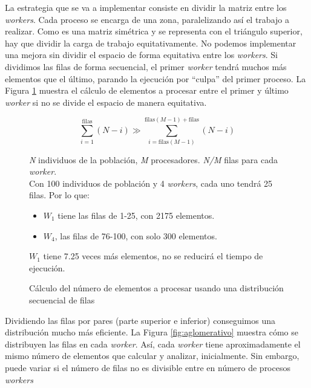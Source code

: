 		La estrategia que se va a implementar consiste en dividir la matriz entre los \textit{workers}. Cada proceso se encarga de una zona, paralelizando así el trabajo a realizar. Como es una matriz simétrica y se representa con el triángulo superior, hay que dividir la carga de trabajo equitativamente. No podemos implementar una mejora sin dividir el espacio de forma equitativa entre los \textit{workers}. Si dividimos las filas de forma secuencial, el primer \textit{worker} tendrá muchos más elementos que el último, parando la ejecución por ``culpa'' del primer proceso. La Figura \ref{fig:prueba} muestra el cálculo de elementos a procesar entre el primer y último \textit{worker} si no se divide el espacio de manera equitativa. 
		
		
		
		\begin{figure}[!h]		
		\begin{mdframed}[roundcorner=5pt]
			\[
			\sum_{i=1}^{\text{filas}} (N - i) \gg \sum_{i=\text{filas}(M-1)}^{\text{filas}(M-1) + \text{filas}} (N - i)
			\]
			\begin{tcolorbox}[boxrule=0.5pt, fontupper=\small]
				
				\textit{N} individuos de la población, \textit{M} procesadores. \textit{N/M} filas para cada \textit{worker}.\\
				
				Con 100 individuos de población y 4 \textit{workers}, cada uno tendrá 25 filas. Por lo que:
				\begin{itemize}
					\item \(W_{1}\) tiene las filas de 1-25, con 2175 elementos. 
					\item \(W_{4}\), las filas de 76-100, con solo 300 elementos. 					
				\end{itemize}
				
				\(W_{1}\) tiene 7.25 veces más elementos, no se reducirá el tiempo de ejecución.
				
							
			\end{tcolorbox}
			
		\end{mdframed}
		
		\caption{Cálculo del número de elementos a procesar usando una distribución secuencial de filas}
		\label{fig:prueba}
		\end{figure}
		
		
		Dividiendo las filas por pares (parte superior e inferior) conseguimos una distribución mucho más eficiente. La Figura \ref{fig:aglomerativo} muestra cómo se distribuyen las filas en cada \textit{worker}. Así, cada \textit{worker} tiene aproximadamente el mismo número de elementos que calcular y analizar, inicialmente. Sin embargo, puede variar si el número de filas no es divisible entre en número de procesos \textit{workers} 
		
